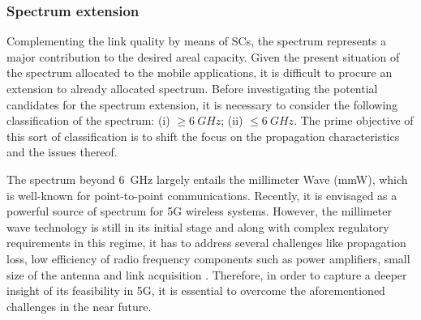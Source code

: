 \subsubsection*{Spectrum extension}
Complementing the link quality by means of SCs, the spectrum represents a major contribution to the desired areal capacity. Given the present situation of the spectrum allocated to the mobile applications, it is difficult to procure an extension to already allocated spectrum. Before investigating the potential candidates for the spectrum extension, it is necessary to consider the following classification of the spectrum:
(i) $\ge \SI{6}{GHz}$;
(ii) $\le \SI{6}{GHz}$.
The prime objective of this sort of classification is to shift the focus on the propagation characteristics and the issues thereof.


The spectrum beyond \SI{6}{GHz} largely entails the millimeter Wave (mmW), which is well-known for point-to-point communications. Recently, it is envisaged as a powerful source of spectrum for 5G wireless systems. However, the millimeter wave technology is still in its initial stage and along with complex regulatory requirements in this regime, it has to address several challenges like propagation loss, low efficiency of radio frequency components such as power amplifiers, small size of the antenna and link acquisition \cite{Rapp13}. Therefore, in order to capture a deeper insight of its feasibility in 5G, it is essential to overcome the aforementioned challenges in the near future.

